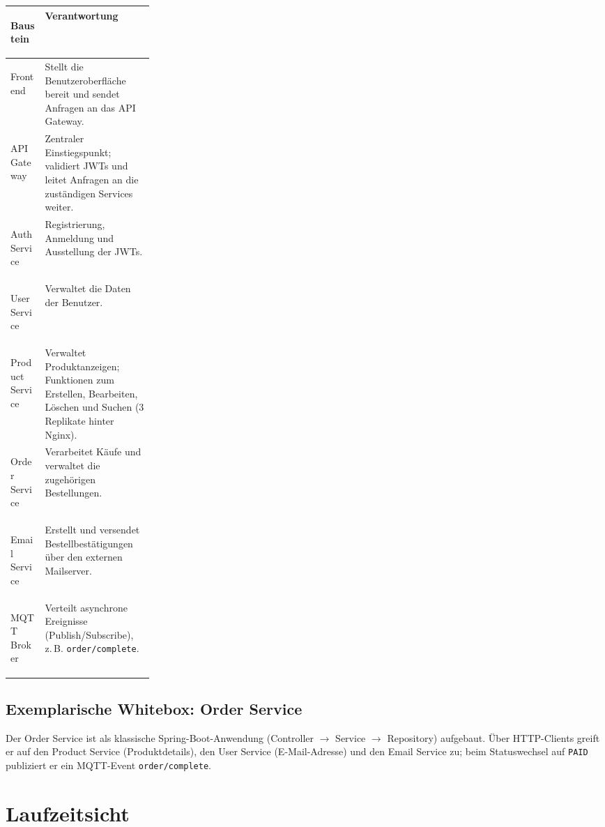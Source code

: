 \documentclass[11pt,a4paper]{article}
\newcommand{\tabellenkopf}{%
  \renewcommand{\arraystretch}{1.4}%
  \rowcolors{2}{tableRowColor}{white}%
}
\begin{document}
\begin{center}
\tabellenkopf
\begin{tabularx}{\linewidth}{
        >{\bfseries\raggedright\arraybackslash}p{0.24\linewidth}
        >{\raggedright\arraybackslash}X}
    \toprule
    \rowcolor{tableHeaderColor}
    Baustein & Verantwortung \\
    \midrule
    Frontend &
    Stellt die Benutzeroberfl\"ache bereit und sendet Anfragen an das
    API Gateway. \\
    API Gateway &
    Zentraler Einstiegspunkt; validiert JWTs und leitet Anfragen an die
    zust\"andigen Services weiter. \\
    Auth Service &
    Registrierung, Anmeldung und Ausstellung der JWTs. \\
    User Service &
    Verwaltet die Daten der Benutzer. \\
    Product Service &
    Verwaltet Produktanzeigen; Funktionen zum Erstellen, Bearbeiten,
    L\"oschen und Suchen (3 Replikate hinter Nginx). \\
    Order Service &
    Verarbeitet K\"aufe und verwaltet die zugeh\"origen Bestellungen. \\
    Email Service &
    Erstellt und versendet Bestellbest\"atigungen \"uber den externen
    Mailserver. \\
    MQTT Broker &
    Verteilt asynchrone Ereignisse (Publish/Subscribe), z.\,B.
    \texttt{order/complete}. \\
    \bottomrule
\end{tabularx}
\end{center}

\subsection{Exemplarische Whitebox: Order Service}

Der Order Service ist als klassische Spring-Boot-Anwendung
(Controller $\rightarrow$ Service $\rightarrow$ Repository) aufgebaut.
\"Uber HTTP-Clients greift er auf den Product Service (Produktdetails),
den User Service (E-Mail-Adresse) und den Email Service zu; beim
Statuswechsel auf \texttt{PAID} publiziert er ein MQTT-Event
\texttt{order/complete}.

\section{Laufzeitsicht}
\end{document}
